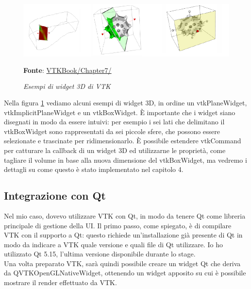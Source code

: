 \begin{figure}[h]
    \centering
    \includegraphics[scale=0.5]{immagini/volumerendering/widgets.png}
    \caption{\textit{Esempi di widget 3D di VTK}}
    \textbf{Fonte}: \href{https://lorensen.github.io/VTKExamples/site/VTKBook/07Chapter7/}{VTKBook/Chapter7/}
    \label{fig: VTK 3D Widgets}
\end{figure}

Nella figura \ref{fig: VTK 3D Widgets} vediamo alcuni esempi di widget 3D, in ordine un vtkPlaneWidget, vtkImplicitPlaneWidget e un vtkBoxWidget. \`E importante che i widget siano disegnati in modo da essere intuivi: per esempio i sei lati che delimitano il vtkBoxWidget sono rappresentati da sei piccole sfere, che possono essere selezionate e trascinate per ridimensionarlo. \`E possibile estendere vtkCommand per catturare la callback di un widget 3D ed utilizzarne le proprietà, come tagliare il volume in base alla nuova dimensione del vtkBoxWidget, ma vedremo i dettagli su come questo è stato implementato nel capitolo 4.

\subsection{Integrazione con Qt}\label{sec:qt-integrazione}
Nel mio caso, dovevo utilizzare VTK con Qt, in modo da tenere Qt come libreria principale di gestione della UI. Il primo passo, come spiegato, è di compilare VTK con il supporto a Qt: questo richiede un'installazione già presente di Qt in modo da indicare a VTK quale versione e quali file di Qt utilizzare. Io ho utilizzato Qt 5.15, l'ultima versione disponibile durante lo stage.\\
Una volta preparato VTK, sarà quindi possibile creare un widget Qt che deriva da QVTKOpenGLNativeWidget, ottenendo un widget apposito su cui è possibile mostrare il render effettuato da VTK.

